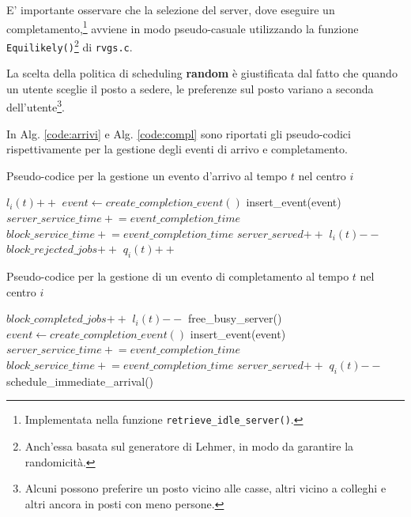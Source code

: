 \documentclass{article}
\begin{document}
E' importante osservare che la selezione del server, dove eseguire un completamento,\footnote{Implementata nella funzione \texttt{retrieve\_idle\_server()}.} avviene in modo pseudo-casuale utilizzando la funzione \texttt{Equilikely()}\footnote{Anch'essa basata sul generatore di Lehmer, in modo da garantire la randomicità.} di \texttt{rvgs.c}. 

La scelta della politica di scheduling \textbf{random} è giustificata dal fatto che quando un utente sceglie il posto a sedere, le preferenze sul posto variano a seconda dell'utente\footnote{Alcuni possono preferire un posto vicino alle casse, altri vicino a colleghi e altri ancora in posti con meno persone.}. 

In Alg. \ref{code:arrivi} e Alg. \ref{code:compl} sono riportati gli pseudo-codici rispettivamente per la gestione degli eventi di arrivo e completamento.  

\begin{algorithm}[H]
	\caption{Pseudo-codice per la gestione un evento d'arrivo al tempo $t$ nel centro $i$}
	\begin{algorithmic}[1]
        \STATE $l_i(t) \mathrel{++}$
	    \STATE $event \leftarrow create\_completion\_event()$
	    \STATE insert\_event(event)
	    \STATE $server\_service\_time \mathrel{+}= event\_completion\_time$
	    \STATE $block\_service\_time \mathrel{+}= event\_completion\_time$
	    \STATE $server\_served \mathrel{++}$
	    \STATE $l_i(t) \mathrel{--}$
        \STATE $block\_rejected\_jobs \mathrel{++}$
	    \ELSE
	    \STATE $q_i(t) \mathrel{++}$
	    \ENDIF
	    \RETURN
	\end{algorithmic}
	\label{code:arrivi}
\end{algorithm}

\begin{algorithm}[H]
	\caption{Pseudo-codice per la gestione di un evento di completamento al tempo $t$ nel centro $i$}
	\begin{algorithmic}[1]
        \STATE $block\_completed\_jobs \mathrel{++}$
        \STATE $l_i(t) \mathrel{--}$
        \STATE free\_busy\_server()
        \RETURN
        \ENDIF
	    \STATE $event \leftarrow create\_completion\_event()$
	    \STATE insert\_event(event)
	    \STATE $server\_service\_time \mathrel{+}= event\_completion\_time$
	    \STATE $block\_service\_time \mathrel{+}= event\_completion\_time$
	    \STATE $server\_served \mathrel{++}$
	    \STATE $q_i(t) \mathrel{--}$
	    \ENDIF
        \ENDIF
        \STATE schedule\_immediate\_arrival()
        \RETURN
	\end{algorithmic}
	\label{code:compl}
\end{algorithm}
\end{document}
